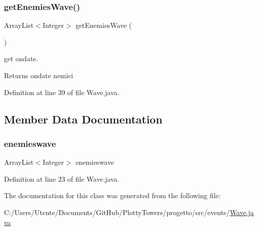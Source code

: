 \subsubsection{\texorpdfstring{get\+Enemies\+Wave()}{getEnemiesWave()}}
{\footnotesize\ttfamily Array\+List$<$Integer$>$ get\+Enemies\+Wave (\begin{DoxyParamCaption}{ }\end{DoxyParamCaption})}



get ondate. 

\begin{DoxyReturn}{Returns}
ondate nemici 
\end{DoxyReturn}


Definition at line 39 of file Wave.\+java.



\subsection{Member Data Documentation}
\mbox{\label{classevents_1_1_wave_af2cde6170a7bb973c8a1b5851deaa0e5}} 
\subsubsection{\texorpdfstring{enemieswave}{enemieswave}}
{\footnotesize\ttfamily Array\+List$<$Integer$>$ enemieswave\hspace{0.3cm}{\ttfamily [private]}}



Definition at line 23 of file Wave.\+java.



The documentation for this class was generated from the following file\+:\begin{DoxyCompactItemize}
\item 
C\+:/\+Users/\+Utente/\+Documents/\+Git\+Hub/\+Plotty\+Towers/progetto/src/events/\hyperlink{_wave_8java}{Wave.\+java}\end{DoxyCompactItemize}
